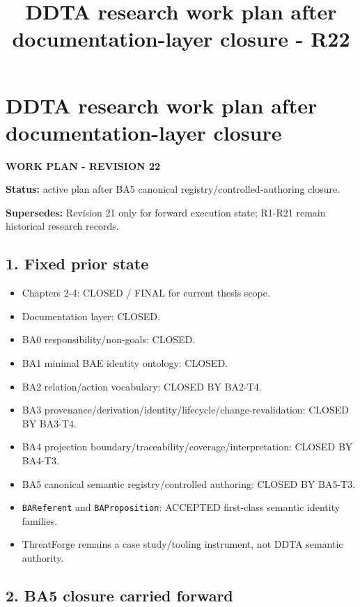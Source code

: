 \documentclass[
  10pt,
  a4paper,
]{article}
\title{DDTA research work plan after documentation-layer closure - R22}
\author{}
\date{}
\providecommand{\tightlist}{%
  \setlength{\itemsep}{0pt}\setlength{\parskip}{0pt}}
\begin{document}
\maketitle

\section{DDTA research work plan after documentation-layer
closure}\label{ddta-research-work-plan-after-documentation-layer-closure}

\textbf{WORK PLAN - REVISION 22}

\textbf{Status:} active plan after BA5 canonical
registry/controlled-authoring closure.

\textbf{Supersedes:} Revision 21 only for forward execution state;
R1-R21 remain historical research records.

\subsection{1. Fixed prior state}\label{1-fixed-prior-state}

\begin{itemize}
\tightlist
\item
  Chapters 2-4: CLOSED / FINAL for current thesis scope.
\item
  Documentation layer: CLOSED.
\item
  BA0 responsibility/non-goals: CLOSED.
\item
  BA1 minimal BAE identity ontology: CLOSED.
\item
  BA2 relation/action vocabulary: CLOSED BY BA2-T4.
\item
  BA3 provenance/derivation/identity/lifecycle/change-revalidation:
  CLOSED BY BA3-T4.
\item
  BA4 projection boundary/traceability/coverage/interpretation: CLOSED
  BY BA4-T3.
\item
  BA5 canonical semantic registry/controlled authoring: CLOSED BY
  BA5-T3.
\item
  \texttt{BAReferent} and \texttt{BAProposition}: ACCEPTED first-class
  semantic identity families.
\item
  ThreatForge remains a case study/tooling instrument, not DDTA semantic
  authority.
\end{itemize}

\subsection{2. BA5 closure carried
forward}\label{2-ba5-closure-carried-forward}
\end{document}
